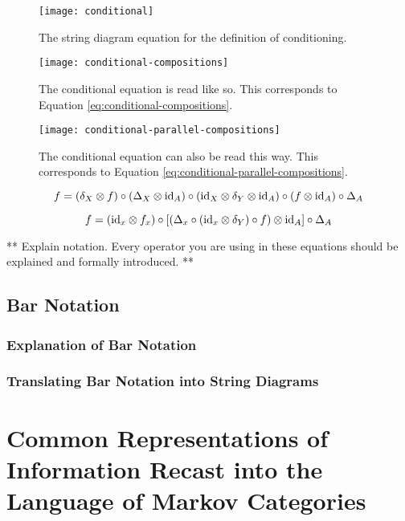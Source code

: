 \begin{figure}[htb]
	\centering
	\texttt{[image: conditional]}
	\caption{The string diagram equation for the definition of conditioning.}
	\label{fig:conditional}
\end{figure}

\begin{figure}[htb]
	\centering
	\texttt{[image: conditional-compositions]}
	\caption{The conditional equation is read like so. This corresponds to Equation \ref{eq:conditional-compositions}.}
	\label{fig:conditional-compositions}
\end{figure}

\begin{figure}[htb]
	\centering
	\texttt{[image: conditional-parallel-compositions]}
	\caption{The conditional equation can also be read this way. This corresponds to Equation \ref{eq:conditional-parallel-compositions}.}
	\label{fig:conditional-parallel-compositions}
\end{figure}

\begin{equation}
\label{eq:conditional-compositions}
f = (\delta_X \otimes f) \circ (\Delta_X \otimes \mathrm{id}_A)
\circ (\mathrm{id}_X \otimes \delta_Y \otimes \mathrm{id}_A) \circ (f \otimes \mathrm{id}_A) \circ \Delta_A
\end{equation}

\begin{equation}
\label{eq:conditional-parallel-compositions}
f = (\mathrm{id}_x \otimes f_x) \circ \left[\left(\Delta_x \circ (\mathrm{id}_x\otimes \delta_Y) \circ f\right) \otimes \mathrm{id}_A\right] \circ \Delta_A
\end{equation}

** Explain notation. Every operator you are using in these equations should be explained and formally introduced. **

\section{Bar Notation}
\subsection{Explanation of Bar Notation}
\subsection{Translating Bar Notation into String Diagrams}

\chapter{Common Representations of Information Recast into the Language of Markov Categories}
